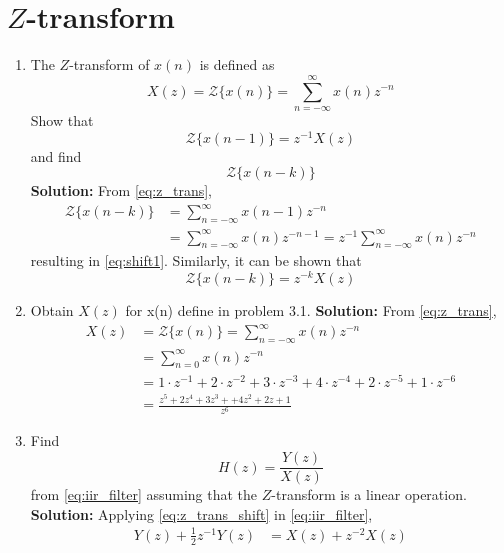 \documentclass[journal,12pt,twocolumn]{IEEEtran}
\newcommand{\solution}{\noindent \textbf{Solution: }}
\numberwithin{equation}{section}
\renewcommand\thesection{\arabic{section}}
\begin{document}
\section{$Z$-transform}
\begin{enumerate}[label=\thesection.\arabic*]
\item The $Z$-transform of $x(n)$ is defined as
%
\begin{equation}
\label{eq:z_trans}
X(z)={\mathcal {Z}}\{x(n)\}=\sum _{n=-\infty }^{\infty }x(n)z^{-n}
\end{equation}
%
Show that
\begin{equation}
\label{eq:shift1}
{\mathcal {Z}}\{x(n-1)\} = z^{-1}X(z)
\end{equation}
and find
\begin{equation}
	{\mathcal {Z}}\{x(n-k)\} 
\end{equation}
\solution From \eqref{eq:z_trans},
\begin{align}
{\mathcal {Z}}\{x(n-k)\} &=\sum _{n=-\infty }^{\infty }x(n-1)z^{-n}
\\
&=\sum _{n=-\infty }^{\infty }x(n)z^{-n-1} = z^{-1}\sum _{n=-\infty }^{\infty }x(n)z^{-n}
\end{align}
resulting in \eqref{eq:shift1}. Similarly, it can be shown that
%
\begin{equation}
\label{eq:z_trans_shift}
	{\mathcal {Z}}\{x(n-k)\} = z^{-k}X(z)
\end{equation}
\item Obtain $X(z)$ for x(n) define in problem 3.1.
\solution From \eqref{eq:z_trans},
\begin{align}
X(z)&={\mathcal{Z}}\{x(n)\}=\sum_{n=-\infty}^{\infty}x(n)z^{-n}\\
\label{eq:genf}
&=\sum_{n=0}^{\infty}x(n)z^{-n}\\
&=1\cdot z^{-1}+2\cdot z^{-2}+3\cdot z^{-3}+4\cdot z^{-4}+2\cdot z^{-5}+1\cdot z^{-6}\\
&=\frac{z^5+2z^4+3z^3++4z^2+2z+1}{z^6}
\end{align}
\item Find
%
\begin{equation}
H(z) = \frac{Y(z)}{X(z)}
\end{equation}
%
from  \eqref{eq:iir_filter} assuming that the $Z$-transform is a linear operation.
\\
\solution  Applying \eqref{eq:z_trans_shift} in \eqref{eq:iir_filter},
\begin{align}
Y(z) + \frac{1}{2}z^{-1}Y(z) &= X(z)+z^{-2}X(z)
\\

\end{align}
\end{enumerate}
\end{document}
